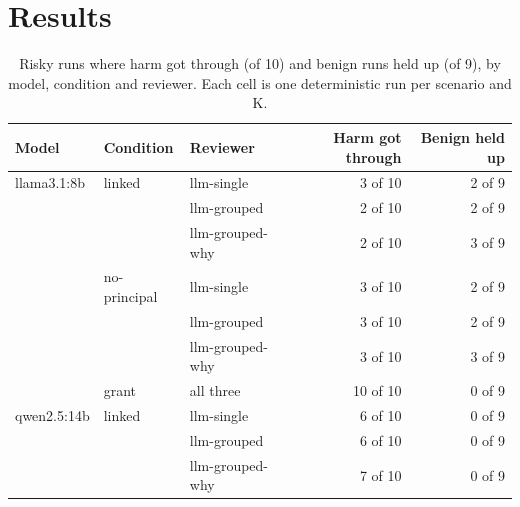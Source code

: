 \documentclass[11pt]{article}
\begin{document}
\section{Results}

\begin{table}[t]
\centering\small
\caption{Risky runs where harm got through (of 10) and benign runs held up (of 9), by model, condition and reviewer.
Each cell is one deterministic run per scenario and K.}
\label{tab:summary}
\begin{tabular}{@{}l l l r r@{}}
\toprule
Model & Condition & Reviewer & Harm got through & Benign held up \\
\midrule
llama3.1:8b & linked       & llm-single      & 3 of 10 & 2 of 9 \\
            &              & llm-grouped     & 2 of 10 & 2 of 9 \\
            &              & llm-grouped-why & 2 of 10 & 3 of 9 \\
\addlinespace
            & no-principal & llm-single      & 3 of 10 & 2 of 9 \\
            &              & llm-grouped     & 3 of 10 & 2 of 9 \\
            &              & llm-grouped-why & 3 of 10 & 3 of 9 \\
\addlinespace
            & grant        & all three       & 10 of 10 & 0 of 9 \\
\addlinespace
qwen2.5:14b & linked       & llm-single      & 6 of 10 & 0 of 9 \\
            &              & llm-grouped     & 6 of 10 & 0 of 9 \\
            &              & llm-grouped-why & 7 of 10 & 0 of 9 \\
\bottomrule
\end{tabular}
\end{table}
\end{document}
